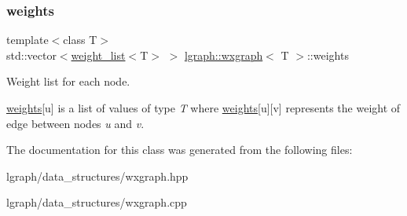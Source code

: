 \subsubsection{\texorpdfstring{weights}{weights}}
{\footnotesize\ttfamily template$<$class T$>$ \\
std\+::vector$<$\hyperlink{namespacelgraph_a1e0fd5ef0a78b2a92da48adbed265cb6}{weight\+\_\+list}$<$T$>$ $>$ \hyperlink{classlgraph_1_1wxgraph}{lgraph\+::wxgraph}$<$ T $>$\+::weights\hspace{0.3cm}{\ttfamily [protected]}}



Weight list for each node. 

\hyperlink{classlgraph_1_1wxgraph_a6f8c983edc82913c2d78b7bc871defe8}{weights}\mbox{[}u\mbox{]} is a list of values of type {\itshape T} where \hyperlink{classlgraph_1_1wxgraph_a6f8c983edc82913c2d78b7bc871defe8}{weights}\mbox{[}u\mbox{]}\mbox{[}v\mbox{]} represents the weight of edge between nodes {\itshape u} and {\itshape v}. 

The documentation for this class was generated from the following files\+:\begin{DoxyCompactItemize}
\item 
lgraph/data\+\_\+structures/wxgraph.\+hpp\item 
lgraph/data\+\_\+structures/wxgraph.\+cpp\end{DoxyCompactItemize}
